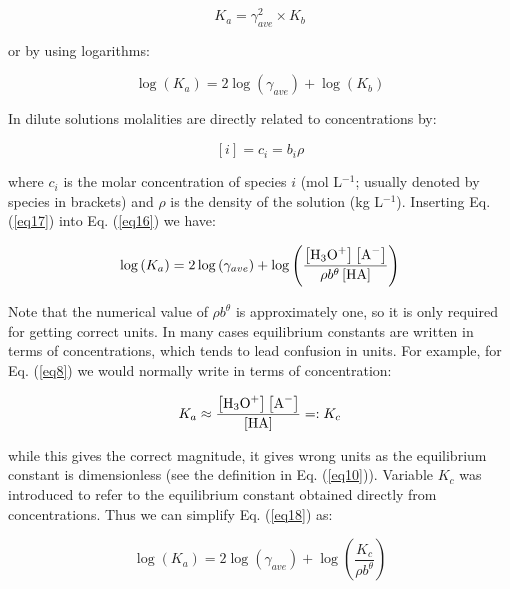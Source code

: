 \documentclass[byrevtex,amssymb,aps,pra,floatfix,letterpaper]{revtex4}
\begin{document}
\begin{equation}
K_a = \gamma_{ave}^2\times K_b
\label{eq15}
\end{equation}

\noindent
or by using logarithms:

\begin{equation}
\log\left(K_a\right) = 2\log\left(\gamma_{ave}\right) + \log\left(K_b\right)
\label{eq16}
\end{equation}

\noindent
In dilute solutions molalities are directly related to concentrations by:

\begin{equation}
\left[i\right] = c_i = b_i\rho
\label{eq17}
\end{equation}

\noindent
where $c_i$ is the molar concentration of species $i$ (mol L$^{-1}$; usually denoted by species in brackets) and $\rho$ is the density of the solution (kg L$^{-1}$). Inserting Eq. (\ref{eq17}) into Eq. (\ref{eq16}) we have:

\begin{equation}
\log\left(K_a\right) = 2\log\left(\gamma_{ave}\right) + \log\left(\frac{\left[\textnormal{H}_3\textnormal{O}^+\right]\left[\textnormal{A}^-\right]}{\rho b^\theta\left[\textnormal{HA}\right]}\right)
\label{eq18}
\end{equation}

\noindent
Note that the numerical value of $\rho b^\theta$ is approximately one, so it is only required for getting correct units. In many cases equilibrium constants are written in terms of concentrations, which tends to lead confusion in units. For example, for Eq. (\ref{eq8}) we would normally write in terms of concentration:

\begin{equation}
K_a \approx \frac{\left[\textnormal{H}_3\textnormal{O}^+\right]\left[\textnormal{A}^-\right]}{\left[\textnormal{HA}\right]} =: K_c
\label{eq19}
\end{equation}

\noindent
while this gives the correct magnitude, it gives wrong units as the equilibrium constant is dimensionless (see the definition in Eq. (\ref{eq10})). Variable $K_c$ was introduced to refer to the equilibrium constant obtained directly from concentrations. Thus we can simplify Eq. (\ref{eq18}) as:

\begin{equation}
\log\left(K_a\right) = 2\log\left(\gamma_{ave}\right) + \log\left(\frac{K_c}{\rho b^\theta}\right)
\label{eq20}
\end{equation}
\end{document}
